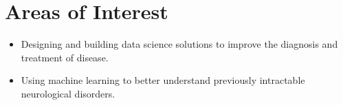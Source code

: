 \section{Areas of Interest}
\closesection

\begin{itemize}
    \item Designing and building data science solutions to improve the diagnosis and treatment of disease. 
    \item Using machine learning to better understand previously intractable neurological disorders.
\end{itemize}